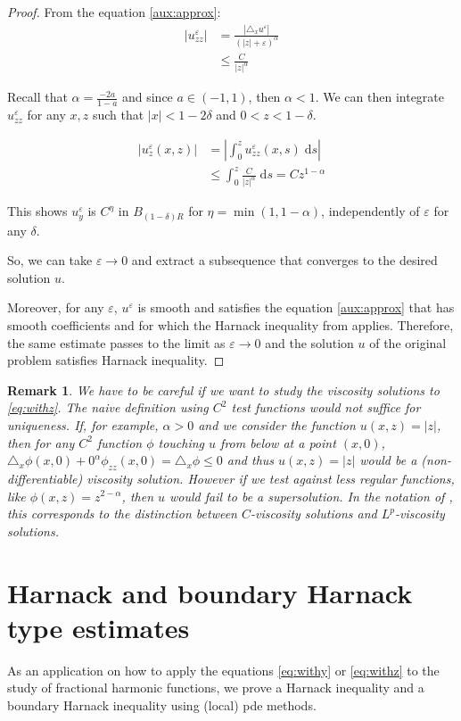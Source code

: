 \documentclass[letterpaper]{article}
\newtheorem{preremark}[thm]{Remark}
\newenvironment{remark}{\begin{preremark}\rm}{\medskip \end{preremark}}
\numberwithin{equation}{section}
\newcommand{\abs}[1]{\left\vert#1\right\vert}
\newcommand{\eps}{\varepsilon}
\newcommand{\lap} {\triangle}
\newcommand{\dd} {\; \mathrm{d}}
\newcommand{\partz}[1] {#1_z}
\newcommand{\partzz}[1] {#1_{zz}}
\begin{document}
\begin{proof}
From the equation \eqref{aux:approx}:
\[ 
\begin{split}
\abs{\partzz u^\eps} &= \frac{\abs{\lap_x u^\eps}}{ (\abs{z}+\eps)^\alpha } \\
& \leq \frac{C}{\abs{z}^\alpha}
\end{split} 
\]

Recall that $\alpha = \frac{-2a}{1-a}$ and since $a \in (-1,1)$, then $\alpha < 1$. We can then integrate $\partzz u^\eps$ for any $x,z$ such that $\abs{x} < 1-2\delta$ and $0<z<1-\delta$.

\[ 
\begin{split}
 \abs{\partz u^\eps (x,z)} &= \abs{\int_0^z \partzz u^\eps (x,s) \dd s } \\ 
 &\leq \int_0^z \frac{C}{\abs{z}^\alpha} \dd s = C z^{1-\alpha}
\end{split}
\]

This shows $u^\eps_y$ is $C^\eta$ in $B_{(1-\delta)R}$ for $\eta= \min(1,1-\alpha)$, independently of $\eps$ for any $\delta$.

So, we can take $\eps \to 0$ and extract a subsequence that converges to the desired solution $u$.

Moreover, for any $\eps$, $u^\eps$ is smooth and satisfies the equation \eqref{aux:approx} that has smooth coefficients and for which the Harnack inequality from \cite{CG} applies. Therefore, the same estimate passes to the limit as $\eps \to 0$ and the solution $u$ of the original problem satisfies Harnack inequality.
\end{proof}

\begin{remark}
We have to be careful if we want to study the \em viscosity \em solutions to \eqref{eq:withz}. The naive definition using $C^2$ test functions would not suffice for uniqueness. If, for example, $\alpha > 0$ and we consider the function $u(x,z) =\abs{z}$, then for any $C^2$ function $\phi$ touching $u$ from below at a point $(x,0)$, 
$ \lap_x \phi(x,0) + 0^\alpha \phi_{zz} (x,0) = \lap_x \phi \leq 0 $ and thus $u(x,z)=\abs{z}$ would be a (non-differentiable) \em viscosity \em solution. However if we test against less regular functions, like $\phi(x,z) = z^{2-\alpha}$, then $u$ would fail to be a supersolution. In the notation of \cite{CCKS}, this corresponds to the distinction between $C$-viscosity solutions and $L^p$-viscosity solutions.
\end{remark}

\section{Harnack and boundary Harnack type estimates}
As an application on how to apply the equations \eqref{eq:withy} or \eqref{eq:withz} to the study of fractional harmonic functions, we prove a Harnack inequality and a boundary Harnack inequality using (local) pde methods.
\end{document}
